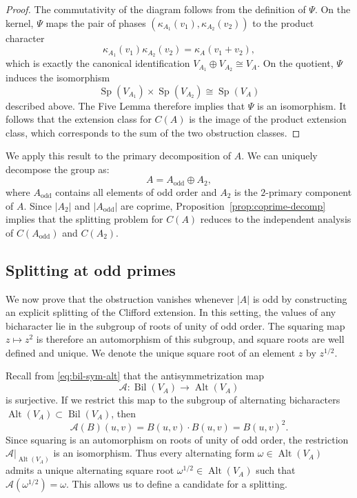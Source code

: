 \documentclass[11pt, reqno]{amsart}
\theoremstyle{definition}
\theoremstyle{remark}
\DeclareMathOperator{\Alt}{Alt}
\DeclareMathOperator{\Sp}{Sp}
\DeclareMathOperator{\Bil}{Bil}
\begin{document}
\begin{proof}
The commutativity of the diagram follows from the definition of $\Psi$. On the kernel, $\Psi$ maps the pair of phases $(\kappa_{A_1}(v_1),\kappa_{A_2}(v_2))$ to the product character
\[
\kappa_{A_1}(v_1)\kappa_{A_2}(v_2)=\kappa_A(v_1+v_2),
\]
which is exactly the canonical identification $V_{A_1}\oplus V_{A_2}\cong V_A$. On the quotient, $\Psi$ induces the isomorphism
\[
\Sp(V_{A_1})\times \Sp(V_{A_2}) \cong \Sp(V_A)
\]
described above. The Five Lemma therefore implies that $\Psi$ is an isomorphism. It follows that the extension class for $C(A)$ is the image of the product extension class, which corresponds to the sum of the two obstruction classes.
\end{proof}

We apply this result to the primary decomposition of $A$. We can uniquely decompose the group as:
\begin{equation}
A = A_{\mathrm{odd}} \oplus A_2,
\end{equation}
where $A_{\mathrm{odd}}$ contains all elements of odd order and $A_2$ is the $2$-primary component of $A$. Since $|A_2|$ and $|A_{\mathrm{odd}}|$ are coprime, Proposition~\ref{prop:coprime-decomp} implies that the splitting problem for $C(A)$ reduces to the independent analysis of $C(A_{\mathrm{odd}})$ and $C(A_2)$.

\subsection{Splitting at odd primes}\label{subsec:odd_case}

We now prove that the obstruction vanishes whenever $|A|$ is odd by constructing an explicit splitting of the Clifford extension. In this setting, the values of any bicharacter lie in the subgroup of roots of unity of odd order. The squaring map $z \mapsto z^2$ is therefore an automorphism of this subgroup, and square roots are well defined and unique. We denote the unique square root of an element $z$ by $z^{1/2}$.

Recall from \eqref{eq:bil-sym-alt} that the antisymmetrization map
\[
\mathcal{A}: \Bil(V_A) \to \Alt(V_A)
\]
is surjective. If we restrict this map to the subgroup of alternating bicharacters $\Alt(V_A)\subset \Bil(V_A)$, then
\begin{equation}
\mathcal{A}(B)(u, v) = B(u, v) \cdot B(u, v) = B(u, v)^2.
\end{equation}
Since squaring is an automorphism on roots of unity of odd order, the restriction $\mathcal{A}|_{\Alt(V_A)}$ is an isomorphism. Thus every alternating form $\omega \in \Alt(V_A)$ admits a unique alternating square root $\omega^{1/2} \in \Alt(V_A)$ such that $\mathcal{A}(\omega^{1/2}) = \omega$. This allows us to define a candidate for a splitting.
\end{document}
